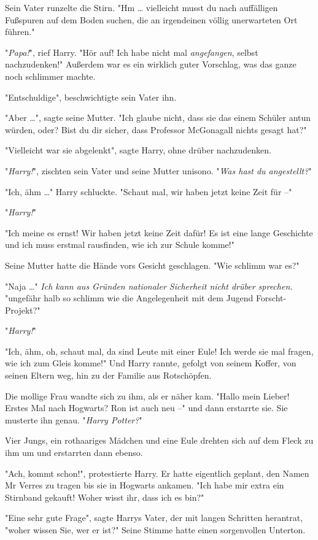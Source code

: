{Sein Vater runzelte die Stirn. "Hm … vielleicht musst du nach auffälligen Fußspuren auf dem Boden suchen, die an irgendeinen völlig unerwarteten Ort führen."

"\emph{Papa!}", rief Harry. "Hör auf! Ich habe nicht mal \emph{angefangen}, selbst nachzudenken!" Außerdem war es ein wirklich guter Vorschlag, was das ganze noch schlimmer machte.

"Entschuldige", beschwichtigte sein Vater ihn.

"Aber …", sagte seine Mutter. "Ich glaube nicht, dass sie das einem Schüler antun würden, oder? Bist du dir sicher, dass Professor McGonagall nichts gesagt hat?"

"Vielleicht war sie abgelenkt", sagte Harry, ohne drüber nachzudenken.

"\emph{Harry!}", zischten sein Vater und seine Mutter unisono. "\emph{Was hast du angestellt?}"

"Ich, ähm …" Harry schluckte. "Schaut mal, wir haben jetzt keine Zeit für --"

"\emph{Harry!}"

"Ich meine es ernst! Wir haben jetzt keine Zeit dafür! Es ist eine lange Geschichte und ich muss erstmal rausfinden, wie ich zur Schule komme!"

Seine Mutter hatte die Hände vors Gesicht geschlagen. "Wie schlimm war es?"

"Naja …" \emph{Ich kann aus Gründen nationaler Sicherheit nicht drüber sprechen.} "ungefähr halb so schlimm wie die Angelegenheit mit dem Jugend Forscht-Projekt?"

"\emph{Harry!}"

"Ich, ähm, oh, schaut mal, da sind Leute mit einer Eule! Ich werde sie mal fragen, wie ich zum Gleis komme!" Und Harry rannte, gefolgt von seinem Koffer, von seinen Eltern weg, hin zu der Familie aus Rotschöpfen.

Die mollige Frau wandte sich zu ihm, als er näher kam. "Hallo mein Lieber! Erstes Mal nach Hogwarts? Ron ist auch neu --" und dann erstarrte sie. Sie musterte ihn genau. "\emph{Harry Potter?}"

Vier Jungs, ein rothaariges Mädchen und eine Eule drehten sich auf dem Fleck zu ihm um und erstarrten dann ebenso.

"Ach, kommt schon!", protestierte Harry. Er hatte eigentlich geplant, den Namen Mr Verres zu tragen bis sie in Hogwarts ankamen. "Ich habe mir extra ein Stirnband gekauft! Woher wisst ihr, dass ich es bin?"

"Eine sehr gute Frage", sagte Harrys Vater, der mit langen Schritten herantrat, "woher wissen Sie, wer er ist?" Seine Stimme hatte einen sorgenvollen Unterton.

}
